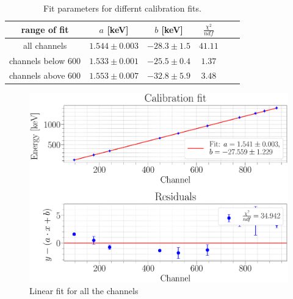 \documentclass[a4paper,12pt]{article}
\begin{document}
\begin{table}[H]
	\renewcommand{\arraystretch}{1}
	\centering
	\Large
	\begin{adjustbox}{width=\textwidth}
		\begin{tabular}{c|ccccc}
			\hline
			range of fit & $a$ [keV] & $b$ [keV] & $\frac{\chi^2}{ndf}$ \\
			\hline
			all channels & $1.544\pm0.003$ & $-28.3\pm1.5$ & $41.11$ \\
			\hline
			channels below 600 & $1.533\pm0.001$ & $-25.5\pm0.4$ & $1.37$ \\
			\hline
			channels above 600 & $1.553\pm0.007$ & $-32.8\pm5.9$ & $3.48$ \\
			\hline
		\end{tabular}
	\end{adjustbox}
	\caption{Fit parameters for differnt calibration fits. }
	\label{tab:calibfit}
\end{table}

\begin{figure}[H]
\centering
\includegraphics[scale=0.25]{../Figures/Calibration_fit.eps}
\caption{Linear fit for all the channels}
\label{calibFit}
\end{figure}
\end{document}
